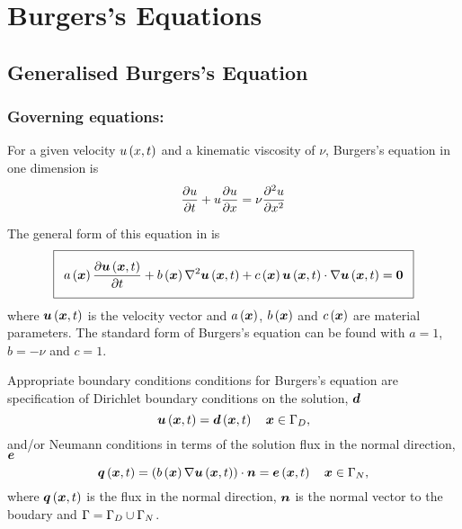 \section{Burgers's Equations}

\subsection{Generalised Burgers's Equation}

\subsubsection{Governing equations:}

For a given velocity $ u\left( x,t \right) $ and a kinematic viscosity of $\nu$, Burgers's equation
in one dimension is
\begin{equation}
  \delby{u}{t}+u\delby{u}{x}=\nu\deltwosqby{u}{x}
  \label{eqn:BurgersEquation}
\end{equation}

The general form of this equation in \OpenCMISS is
\begin{equation}
  \addtolength{\fboxsep}{5pt}
  \boxed{
    \fnof{a}{\vectr{x}}\delby{\fnof{\vectr{u}}{\vectr{x},t}}{t}+\fnof{b}{\vectr{x}}\laplacian{}{\fnof{\vectr{u}}{\vectr{x},t}}+
    \fnof{c}{\vectr{x}}\dotprod{\fnof{\vectr{u}}{\vectr{x},t}}{\gradient{}{\fnof{\vectr{u}}{\vectr{x},t}}}=\vectr{0}
  }
  \label{eqn:GeneralFormBurgersEquation}
\end{equation}
where $  \boldsymbol{u} \left(  \boldsymbol{x} ,t \right) $ is the velocity vector and
$ a\left(  \boldsymbol{x}  \right) $, $ b\left(  \boldsymbol{x}  \right) $ and $ c\left(  \boldsymbol{x}  \right) $ are
material parameters. The standard form of Burgers's equation can be found with
$a=1$, $b=-\nu$ and $c=1$.

Appropriate boundary conditions conditions for Burgers's
equation are specification of Dirichlet boundary conditions on the solution,
$ \boldsymbol{d} $ \ie
\begin{equation}
  \fnof{\vectr{u}}{\vectr{x},t} = \fnof{\vectr{d}}{\vectr{x},t} \quad \vectr{x}\in\Gamma_{D},
  \label{eqn:BurgersDirichletBC} 
\end{equation}
and/or Neumann conditions in terms of the solution flux in the normal
direction, $ \boldsymbol{e} $ \ie
\begin{equation}
  \fnof{\vectr{q}}{\vectr{x},t} = \dotprod{\pbrac{\fnof{b}{\vectr{x}}
      \gradient{}{\fnof{\vectr{u}}{\vectr{x},t}}}}{\normal} =
  \fnof{\vectr{e}}{\vectr{x},t} \quad \vectr{x}\in\Gamma_{N},
  \label{eqn:BurgersNeumannBC} 
\end{equation}
where $  \boldsymbol{q} \left(  \boldsymbol{x} ,t \right) $ is the flux in the normal direction, $ \boldsymbol{n} $ is the normal
vector to the boudary and $\Gamma=\Gamma_{D}\cup\Gamma_{N}$.

